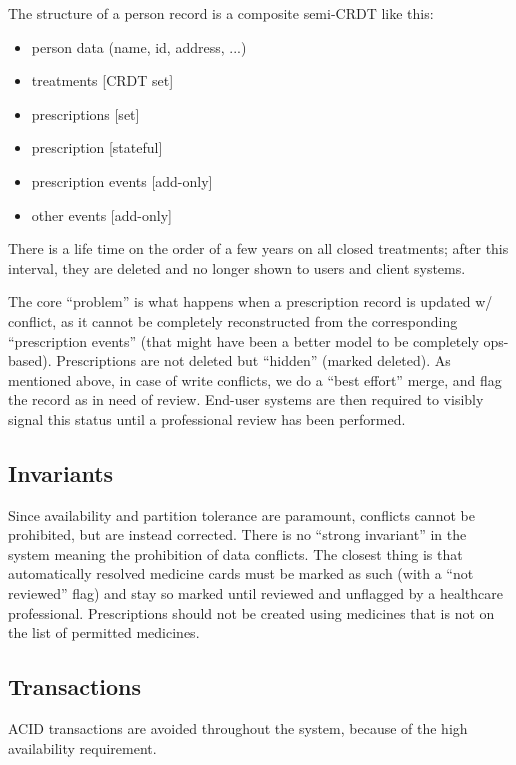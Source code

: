 \documentclass[11pt,a4paper]{report}
\begin{document}
The structure of a person record is a composite semi-CRDT like this:
\begin{itemize}
\item person data (name, id, address, ...)
\item treatments [CRDT set]
\item prescriptions [set]
\item prescription [stateful]
\item prescription events [add-only]
\item other events [add-only]
\end{itemize}


There is a life time on the order of a few years on all closed treatments; after this interval, they are deleted and no longer shown to users and client systems.

The core ``problem'' is what happens when a prescription record is updated w/ conflict, as it cannot be completely reconstructed from the corresponding ``prescription events'' (that might have been a better model to be completely ops-based). Prescriptions are not deleted but ``hidden'' (marked deleted). As mentioned above, in case of write conflicts, we do a ``best effort'' merge, and flag the record as in need of review. End-user systems are then required to visibly signal this status until a professional review has been performed.

\subsection{Invariants}
Since availability and partition tolerance are paramount, conflicts cannot be prohibited, but are instead corrected. There is no ``strong invariant'' in the system meaning the prohibition of data conflicts. The closest thing is that automatically resolved medicine cards must be marked as such (with a ``not reviewed'' flag) and stay so marked until reviewed and unflagged by a healthcare professional.
Prescriptions should not be created using medicines that is not on  the list of permitted medicines.

\subsection{Transactions}
ACID transactions are avoided throughout the system, because of the high availability requirement.
\end{document}
